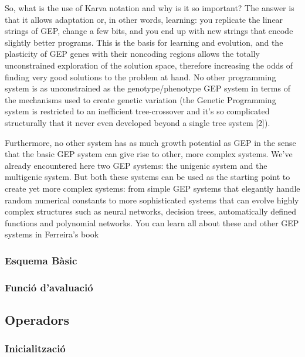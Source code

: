 \documentclass[titlepage,a4paper,12pt]{book}
\begin{document}
So, what is the use of Karva notation and why is it so important? The answer is that it allows adaptation or, in other words, learning: you replicate the linear strings of GEP, change a few bits, and you end up with new strings that encode slightly better programs. This is the basis for learning and evolution, and the plasticity of GEP genes with their noncoding regions allows the totally unconstrained exploration of the solution space, therefore increasing the odds of finding very good solutions to the problem at hand. No other programming system is as unconstrained as the genotype/phenotype GEP system in terms of the mechanisms used to create genetic variation (the Genetic Programming system is restricted to an inefficient tree-crossover and it's so complicated structurally that it never even developed beyond a single tree system [2]).

Furthermore, no other system has as much growth potential as GEP in the sense that the basic GEP system can give rise to other, more complex systems. We've already encountered here two GEP systems: the unigenic system and the multigenic system. But both these systems can be used as the starting point to create yet more complex systems: from simple GEP systems that elegantly handle random numerical constants to more sophisticated systems that can evolve highly complex structures such as neural networks, decision trees, automatically defined functions and polynomial networks. You can learn all about these and other GEP systems in Ferreira's book


\subsubsection{Esquema Bàsic} %
\label{ssub:Esquema Basic}

\subsubsection{Funció d'avaluació} %
\label{ssub:funcio d'avaluacio}

\subsection{Operadors} %
\label{sub:Operadors}

\subsubsection{Inicialització} %
\label{ssub:Inicialitzacio}
\end{document}
